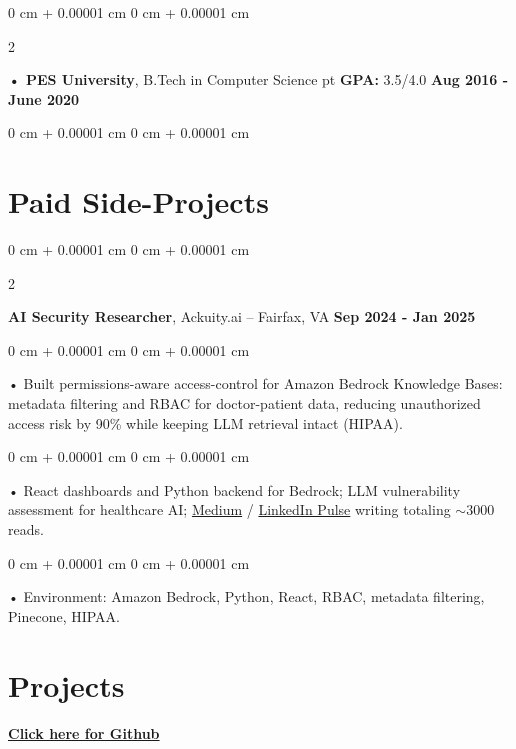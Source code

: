 \documentclass[10pt, letterpaper]{article}
\newenvironment{onecolentry}{
    \begin{adjustwidth}{
        0 cm + 0.00001 cm
    }{
        0 cm + 0.00001 cm
    }
}{
    \end{adjustwidth}
} %
\newenvironment{twocolentry}[2][]{
    \onecolentry
    \def\secondColumn{#2}
    \setcolumnwidth{\fill, 4.5 cm}
    \begin{paracol}{2}
}{
    \switchcolumn \raggedleft \secondColumn
    \end{paracol}
    \endonecolentry
} %
\begin{document}
        \begin{twocolentry}{
            \textbf{Aug 2016 - June 2020}
        }
            \textbf{ • PES University}, B.Tech in Computer Science  pt \textbf{GPA:} 3.5/4.0  \end{twocolentry}
        \begin{onecolentry}

                        \vspace{2 pt }
    \section{Paid Side-Projects}
            \vspace{2 pt }
                    \begin{twocolentry}{
            \textbf{Sep 2024 - Jan 2025}
        }
            \textbf{AI Security Researcher}, Ackuity.ai -- Fairfax, VA\end{twocolentry}

        \begin{onecolentry}
             • Built permissions-aware access-control for Amazon Bedrock Knowledge Bases: metadata filtering and RBAC for doctor-patient data, reducing unauthorized access risk by 90\% while keeping LLM retrieval intact (HIPAA).
        \end{onecolentry}
        \begin{onecolentry}
             • React dashboards and Python backend for Bedrock; LLM vulnerability assessment for healthcare AI; \href{https://medium.com/@sreenikethaathreya/building-a-permission-aware-genai-application-on-amazon-bedrock-8fdc2410dd43}{Medium} / \href{https://www.linkedin.com/pulse/building-permission-aware-genai-application-amazon-bedrock-aathreya-g7nme/}{LinkedIn Pulse} writing totaling $\sim$3000 reads.
        \end{onecolentry}
        \begin{onecolentry}
             • Environment: Amazon Bedrock, Python, React, RBAC, metadata filtering, Pinecone, HIPAA.
        \end{onecolentry}
        \vspace{2 pt }
\section{Projects}
    \vspace{2 pt}
\end{onecolentry}
\textbf{\href{https://github.com/daedalus-s}{Click here for Github}}
\end{document}
